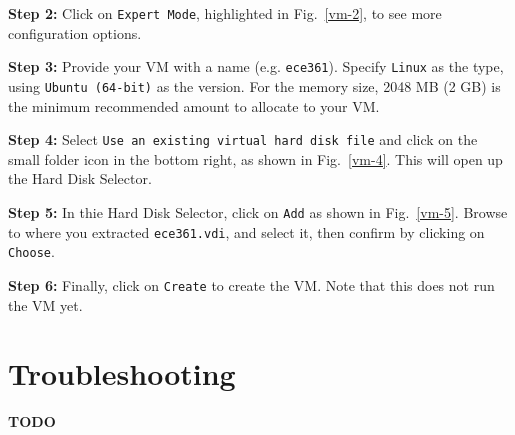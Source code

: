 \documentclass[11pt]{article}
\begin{document}
\textbf{Step 2:} Click on \texttt{Expert Mode}, highlighted in Fig.~\ref{vm-2}, to see more configuration options.

\textbf{Step 3:} Provide your VM with a name (e.g. \texttt{ece361}). Specify \texttt{Linux} as the type, using \texttt{Ubuntu (64-bit)} as the version. For the memory size, 2048 MB (2 GB) is the minimum recommended amount to allocate to your VM. 

\textbf{Step 4:} Select \texttt{Use an existing virtual hard disk file} and click on the small folder icon in the bottom right, as shown in Fig.~\ref{vm-4}. This will open up the Hard Disk Selector.

\textbf{Step 5:} In thie Hard Disk Selector, click on \texttt{Add} as shown in Fig.~\ref{vm-5}. Browse to where you extracted \texttt{ece361.vdi}, and select it, then confirm by clicking on \texttt{Choose}.

\textbf{Step 6:} Finally, click on \texttt{Create} to create the VM. Note that this does not run the VM yet.


\section{Troubleshooting}
\label{sec:troubleshooting}
\textbf{TODO}
\end{document}
